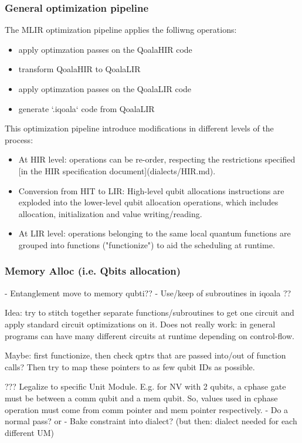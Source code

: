 \subsubsection{General optimization pipeline}
The MLIR optimization pipeline applies the folliwng operations:
\begin{itemize}
\item apply optimzation passes on the QoalaHIR code
\item transform QoalaHIR to QoalaLIR
\item apply optimzation passes on the QoalaLIR code
\item generate `.iqoala` code from QoalaLIR
\end{itemize}

This optimization pipeline introduce modifications in different levels of the process:
\begin{itemize}
\item At HIR level: operations can be re-order, respecting the restrictions specified
  [in the HIR specification document](dialects/HIR.md).
\item Conversion from HIT to LIR: High-level qubit allocations instructions are exploded
  into the lower-level qubit allocation operations, which includes allocation,
  initialization and value writing/reading.
\item At LIR level: operations belonging to the same local quantum functions are grouped
  into functions ("functionize") to aid the scheduling at runtime.
\end{itemize}


\subsubsection{Memory Alloc (i.e. Qbits allocation)}
- Entanglement move to memory qubti??
- Use/keep of subroutines in iqoala ??

Idea: try to stitch together separate functions/subroutines to get one circuit and apply standard circuit optimizations on it.
Does not really work: in general programs can have many different circuits at runtime depending on control-flow.

Maybe: first functionize, then check qptrs that are passed into/out of function calls? Then try to map these pointers to as few qubit IDs as possible.

??? Legalize to specific Unit Module. E.g. for NV with 2 qubits, a cphase gate must be between a comm qubit and a mem qubit. So, values used in cphase operation must come from comm pointer and mem pointer respectively. 
- Do a normal pass? or
- Bake constraint into dialect? (but then: dialect needed for each different UM)


